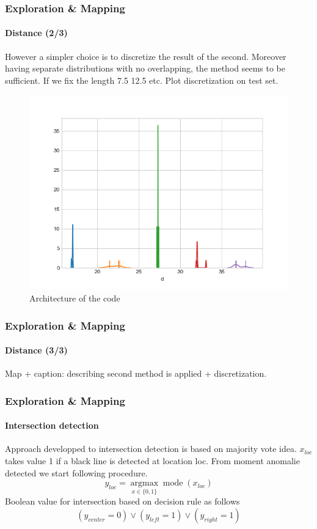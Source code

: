 \documentclass[10pt]{beamer}
\begin{document}

\begin{frame}
\frametitle{Exploration \& Mapping}
\framesubtitle{Distance (2/3)}
However a simpler choice is to discretize the result of the second. Moreover having separate distributions with no overlapping, the method seems to be sufficient.
If we fix the length 7.5 12.5 etc.
Plot discretization on test set.
\begin{figure}[hbtp]
\centering
\label{fig:architecture}
\includegraphics[scale=0.45]{figures/distrib.png}
\caption{Architecture of the code}
\end{figure}
\end{frame}


\begin{frame}
\frametitle{Exploration \& Mapping}
\framesubtitle{Distance (3/3)}
Map + caption: describing second method is applied + discretization.
\end{frame}


\begin{frame}
\frametitle{Exploration \& Mapping}
\framesubtitle{Intersection detection}
Approach developped to intersection detection is based on majority vote idea. $x_{loc}$ takes value 1 if a black line is detected at location loc. From moment anomalie detected we start following procedure.
$$
y_{loc} = \underset{x \in  \{0,1\}}{\operatorname{argmax}} \operatorname{mode}(x_{loc})
$$
Boolean value for intersection based on decision rule as follows
$$
(y_{center} = 0) \lor (y_{left} = 1) \lor (y_{right} = 1) 
$$
\end{frame}
\end{document}
